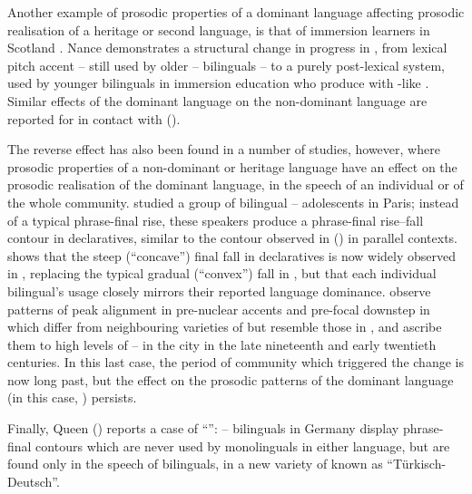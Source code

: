 \documentclass[output=paper]{langsci/langscibook}
\begin{document}
Another example of prosodic properties of a dominant language affecting prosodic realisation of a heritage or second language, is that of immersion  learners in Scotland \citep{Nance2015}. Nance demonstrates a structural change in progress in , from lexical pitch accent – still used by older -- bilinguals – to a purely post-lexical system, used by younger bilinguals in immersion education who produce  with -like .  Similar effects of the dominant language on the non-dominant language are reported for  in contact with  (\citealt{ORourke2004}).  

The reverse effect has also been found in a number of studies, however, where prosodic properties of a non-dominant or heritage language have an effect on the prosodic realisation of the dominant language, in the speech of an individual or of the whole community. \citet{Fagyal2005} studied a group of bilingual -- adolescents in Paris; instead of a typical  phrase-final rise, these speakers produce a phrase-final rise--fall contour in declaratives, similar to the contour observed in  () in parallel contexts. \citet{Simonet2011} shows that the steep (``concave'') final fall in  declaratives is now widely observed in , replacing the typical gradual (``convex'') fall in , but that each individual bilingual’s usage closely mirrors their reported language dominance. \citet{ColantoniGurlekian2004} observe patterns of peak alignment in pre-nuclear accents and pre-focal downstep in  which differ from neighbouring varieties of  but resemble those in , and ascribe them to high levels of --  in the city in the late nineteenth and early twentieth centuries. In this last case, the period of community  which triggered the change is now long past, but the effect on the prosodic patterns of the dominant language (in this case, ) persists.

Finally, Queen (\citeyear{Queen2001,Queen2012}) reports a case of ``'': -- bilinguals in Germany display phrase-final  contours which are never used by monolinguals in either language, but are found only in the speech of bilinguals, in a new variety of  known as ``Türkisch-Deutsch''.
\end{document}
